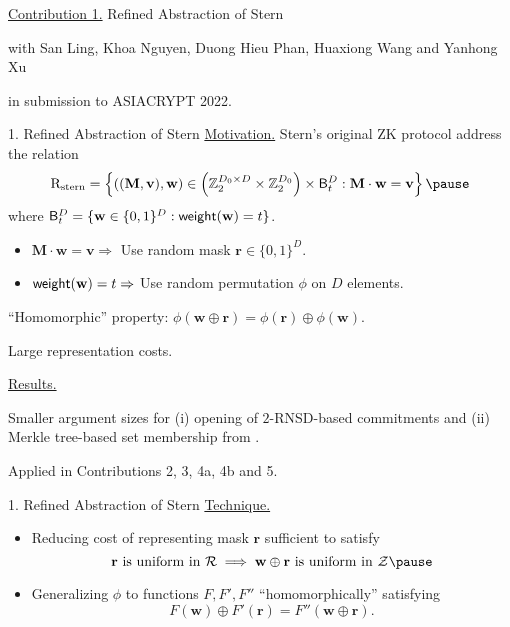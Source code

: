 \begin{frame}{}
	\underline{Contribution 1.} Refined Abstraction of Stern
	
	{\small with San Ling, Khoa Nguyen, Duong Hieu Phan, Huaxiong Wang and Yanhong Xu}
	
	in submission to ASIACRYPT 2022.
\end{frame}

\begin{frame}{1. Refined Abstraction of Stern}
	\underline{Motivation.} Stern's original ZK protocol address the relation \pause
	\begin{equation*}
		\RelationStern = \left\{((\mathbf{M},\mathbf{v}), \mathbf{w}) \in \left(\mathbb{Z}_2^{D_0\times D}\times \mathbb{Z}_2^{D_0}\right)\times \FixedWeightSet^D_t : \mathbf{M}\cdot\mathbf{w} = \mathbf{v}\right\}\pause
	\end{equation*}
	where $\mathsf{B}^D_t = \{\mathbf{w} \in \{0,1\}^D : \mathsf{weight}(\mathbf{w}) = t\}$.\pause
	\begin{itemize}
			\item $\mathbf{M}\cdot\mathbf{w} =\mathbf{v} \Rightarrow$ Use random mask $\mathbf{r} \in \{0,1\}^D$.\pause
			\item $\mathsf{weight}(\mathbf{w}) = t \Rightarrow$ Use random permutation $\phi$ on $D$ elements.\pause
	\end{itemize}
	
	``Homomorphic'' property: $\phi(\mathbf{w} \oplus \mathbf{r}) = \phi(\mathbf{r}) \oplus \phi(\mathbf{w})$.\pause
	
	Large representation costs.\pause
	
	\underline{Results.}\pause
	
	Smaller argument sizes for (i) opening of $2$-RNSD-based commitments and (ii) Merkle tree-based set membership from \cite{NguyenTWZ19}.\pause
	
	Applied in Contributions 2, 3, 4a, 4b and 5.
\end{frame}

\begin{frame}{1. Refined Abstraction of Stern}
	\underline{Technique.}\pause
	\begin{itemize}
		\item Reducing cost of representing mask $\mathbf{r}$ sufficient to satisfy \pause
		\begin{equation*}
			\mathbf{r} \text{ is uniform in } \mathcal{R}\implies \mathbf{w} \oplus \mathbf{r} \text{ is uniform in } \mathcal{Z}\pause
		\end{equation*}  
		\item Generalizing $\phi$ to functions $F, F', F''$ ``homomorphically'' satisfying\pause
		\begin{equation*}
			F(\mathbf{w}) \oplus F'(\mathbf{r}) = F''(\mathbf{w} \oplus \mathbf{r}).
		\end{equation*}
	\end{itemize}
\end{frame}